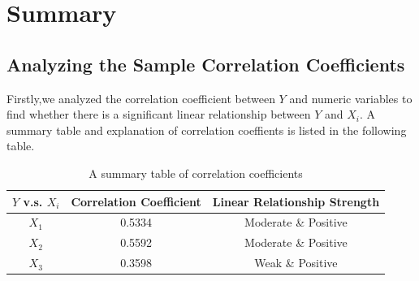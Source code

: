 \documentclass[a4paper,11pt,onecolumn,twoside]{article}
\begin{document}
\section{Summary}

\subsection{Analyzing the Sample Correlation Coefficients}
Firstly,we analyzed the correlation coefficient between $Y$ and numeric variables to find whether there is a significant linear relationship between $Y$ and $X_i$. A summary table and explanation of correlation coeffients is listed in the following table.
 \begin{table}[htbp]
	\centering
	\begin{tabular}{ccc}
		\midrule[1.5pt]
		 $Y$ v.s. $X_i$&Correlation Coefficient & Linear Relationship Strength\\
		\hline
	    $X_1$ &  0.5334& Moderate \& Positive\\
		$X_2$ &  0.5592 &Moderate \& Positive  \\
		$X_3$ &  0.3598& Weak \& Positive  \\
		\midrule[1.5pt]
	\end{tabular}
	\caption{A summary table of correlation coefficients }
\end{table}
\end{document}
